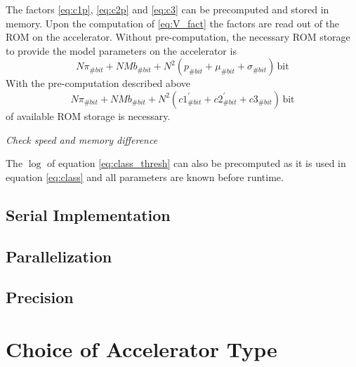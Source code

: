 \documentclass[mscthesis]{usiinfthesis}
\begin{document}
The factors \ref{eq:c1p}, \ref{eq:c2p} and \ref{eq:c3} can be precomputed and
stored in memory. Upon the computation of \ref{eq:V_fact} the factors are read
out of the ROM on the accelerator. Without pre-computation, the necessary ROM
storage to provide the model parameters on the accelerator is
\begin{equation}
    N \pi_{\#bit}
        + NM b_{\#bit}
        + N^2 ( p_{\#bit} + \mu_{\#bit} + \sigma_{\#bit})
        \,\text{bit}
\end{equation}
With the pre-computation described above
\begin{equation}
    N \pi_{\#bit}
        + NM b_{\#bit}
        + N^2 (c1_{\#bit}^{'} + c2_{\#bit}^{'} + c3_{\#bit})
        \,\text{bit}
\end{equation}
of available ROM storage is necessary.

\emph{\color{red}Check speed and memory difference}

The $ \log $ of equation \ref{eq:class_thresh} can also be precomputed as it is
used in equation \ref{eq:class} and all parameters are known before runtime.

\subsection{Serial Implementation}




\subsection{Parallelization}

\subsection{Precision}


\section{Choice of Accelerator Type}
\end{document}
